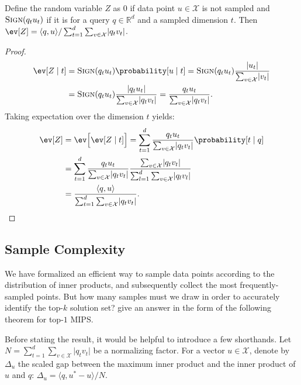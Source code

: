 \begin{lemma}
    \label{lemma:sampling:wedge:expected-value}
    Define the random variable $Z$ as $0$ if data point $u \in \mathcal{X}$
    is not sampled and $\textsc{Sign}(q_t u_t)$ if it is for a query $q \in \mathbb{R}^d$
    and a sampled dimension $t$.
    Then $\ev[Z] = \langle q, u \rangle / \sum_{t = 1}^d \sum_{v \in \mathcal{X}} \lvert q_t v_t \rvert$.
\end{lemma}
\begin{proof}
    \begin{align*}
        \ev[Z \;|\; t] &= \textsc{Sign}(q_t u_t) \probability[u \;|\; t]
        = \textsc{Sign}(q_t u_t) \frac{\lvert u_t \rvert}{\sum_{v \in \mathcal{X}} \lvert v_t \rvert} \\
        &= \textsc{Sign}(q_t u_t) \frac{\lvert q_t u_t \rvert}{\sum_{v \in \mathcal{X}} \lvert q_t v_t \rvert}
        = \frac{q_t u_t}{\sum_{v \in \mathcal{X}} \lvert q_t v_t \rvert}.
    \end{align*}
    Taking expectation over the dimension $t$ yields:
    \begin{align*}
        \ev[Z] &= \ev\Big[\ev[Z \;|\; t]\Big] = \sum_{t = 1}^d \frac{q_t u_t}{\sum_{v \in \mathcal{X}} \lvert q_t v_t \rvert} \probability[t \;|\; q] \\
        &= \sum_{t = 1}^d \frac{q_t u_t}{\sum_{v \in \mathcal{X}} \lvert q_t v_t \rvert}
            \frac{\sum_{v \in \mathcal{X}} \lvert q_t v_t \rvert}{\sum_{l=1}^d \sum_{v \in \mathcal{X}} \lvert q_l v_l \rvert} \\
        &= \frac{\langle q, u \rangle}{\sum_{t = 1}^d \sum_{v \in \mathcal{X}} \lvert q_t v_t \rvert}.
    \end{align*}
\end{proof}

\subsection{Sample Complexity}
We have formalized an efficient way to sample data points according to the distribution
of inner products, and subsequently collect the most frequently-sampled points.
But how many samples must we draw in order to accurately identify the top-$k$ solution set?
\cite{pmlr-v89-ding19a} give an answer in the form of the following theorem for top-$1$ MIPS.

Before stating the result, it would be helpful to introduce a few shorthands.
Let $N = \sum_{t = 1}^d \sum_{v \in \mathcal{X}} \lvert q_t v_t \rvert$ be a normalizing factor.
For a vector $u \in \mathcal{X}$, denote by $\Delta_u$ the scaled gap between the
maximum inner product and the inner product of $u$ and $q$:
$\Delta_u = \langle q, u^\ast - u \rangle / N$.

